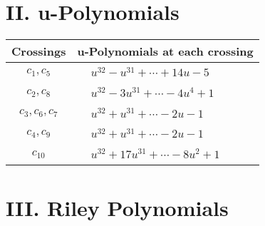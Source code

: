 \documentclass[1p]{elsarticle_modified}
\theoremstyle{definition}
\begin{document}
\newpage\renewcommand{\arraystretch}{1}
\centering \section*{ II. u-Polynomials}
\begin{tabular}{m{50pt}|m{274pt}}
Crossings & \hspace{64pt}u-Polynomials at each crossing \\
\hline $$\begin{aligned}c_{1},c_{5}\end{aligned}$$&$\begin{aligned}
&u^{32}- u^{31}+\cdots+14 u-5
\end{aligned}$\\
\hline $$\begin{aligned}c_{2},c_{8}\end{aligned}$$&$\begin{aligned}
&u^{32}-3 u^{31}+\cdots-4 u^4+1
\end{aligned}$\\
\hline $$\begin{aligned}c_{3},c_{6},c_{7}\end{aligned}$$&$\begin{aligned}
&u^{32}+u^{31}+\cdots-2 u-1
\end{aligned}$\\
\hline $$\begin{aligned}c_{4},c_{9}\end{aligned}$$&$\begin{aligned}
&u^{32}+u^{31}+\cdots-2 u-1
\end{aligned}$\\
\hline $$\begin{aligned}c_{10}\end{aligned}$$&$\begin{aligned}
&u^{32}+17 u^{31}+\cdots-8 u^2+1
\end{aligned}$\\
\hline
\end{tabular}\newpage\renewcommand{\arraystretch}{1}
\centering \section*{ III. Riley Polynomials}
\end{document}
